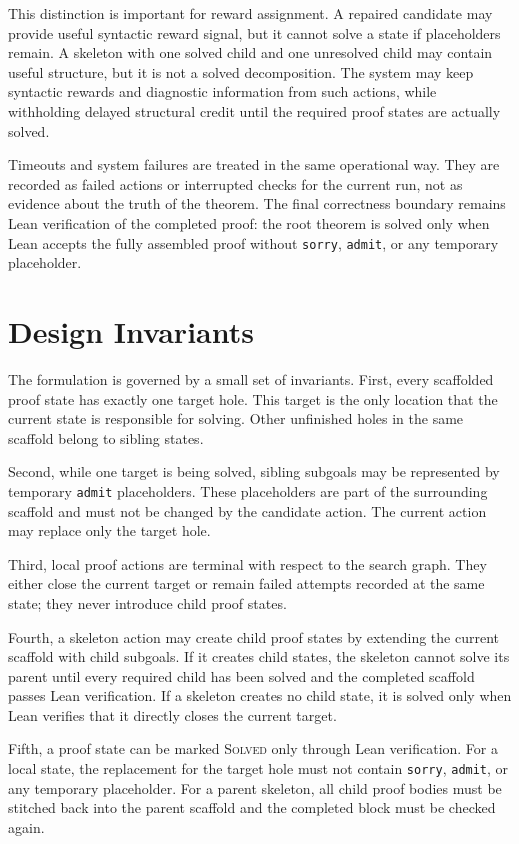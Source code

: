 This distinction is important for reward assignment. A repaired candidate may provide useful syntactic reward signal, but it cannot solve a state if placeholders remain. A skeleton with one solved child and one unresolved child may contain useful structure, but it is not a solved decomposition. The system may keep syntactic rewards and diagnostic information from such actions, while withholding delayed structural credit until the required proof states are actually solved.

Timeouts and system failures are treated in the same operational way. They are recorded as failed actions or interrupted checks for the current run, not as evidence about the truth of the theorem. The final correctness boundary remains Lean verification of the completed proof: the root theorem is solved only when Lean accepts the fully assembled proof without \texttt{sorry}, \texttt{admit}, or any temporary placeholder.

\section{Design Invariants}

The formulation is governed by a small set of invariants. First, every scaffolded proof state has exactly one target hole. This target is the only location that the current state is responsible for solving. Other unfinished holes in the same scaffold belong to sibling states.

Second, while one target is being solved, sibling subgoals may be represented by temporary \texttt{admit} placeholders. These placeholders are part of the surrounding scaffold and must not be changed by the candidate action. The current action may replace only the target hole.

Third, local proof actions are terminal with respect to the search graph. They either close the current target or remain failed attempts recorded at the same state; they never introduce child proof states.

Fourth, a skeleton action may create child proof states by extending the current scaffold with child subgoals. If it creates child states, the skeleton cannot solve its parent until every required child has been solved and the completed scaffold passes Lean verification. If a skeleton creates no child state, it is solved only when Lean verifies that it directly closes the current target.

Fifth, a proof state can be marked \textsc{Solved} only through Lean verification. For a local state, the replacement for the target hole must not contain \texttt{sorry}, \texttt{admit}, or any temporary placeholder. For a parent skeleton, all child proof bodies must be stitched back into the parent scaffold and the completed block must be checked again.

